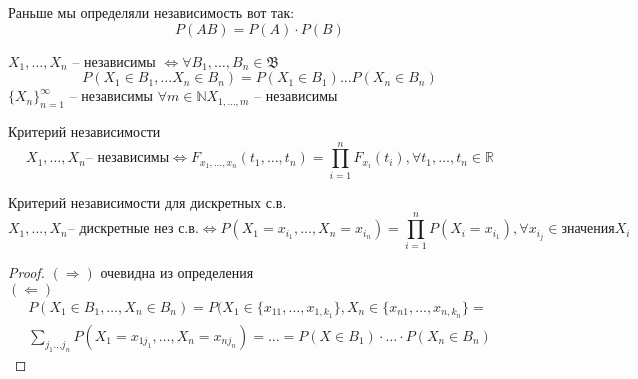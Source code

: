 \documentclass{article}
\newcommand{\B}{{\mathfrak B}}
\begin{document}
    Раньше мы определяли независимость вот так:
    $$ P(AB) = P(A) \cdot P(B) $$
    \begin{definition}
        $ X_1, \dots , X_n $ -- независимы $ \Leftrightarrow \forall B_1, \dots, B_n \in \B $
        $$P(X_1 \in B_1, \dots X_n \in B_n) = P(X_1 \in B_1) \dots P(X_n \in B_n)$$
         $\{X_n\}_{n=1}^{\infty} $ -- независимы $ \forall m \in \mathbb{N} X_{1, \dots, m} $ -- независимы
    \end{definition}

    \begin{theorem}{Критерий независимости}
    $$ X_1, \dots, X_n \text{-- независимы} \Leftrightarrow F_{x_1, \dots, x_n} (t_1, \dots, t_n) = \prod_{i=1}^n F_{x_i} (t_i), \forall t_1, \dots, t_n \in \mathbb{R}$$
    \end{theorem}
    \begin{theorem}{Критерий независимости для дискретных с.в.}
    $$ X_1, \dots, X_n \text{-- дискретные нез с.в.} \Leftrightarrow P(X_1=x_{i_1}, \dots, X_n = x_{i_n}) = \prod_{i=1}^n P(X_i=x_{i_1}), \forall x_{i_j} \in \text{значения} X_i$$
    \end{theorem}
    \begin{proof}
    $(\Rightarrow)$ очевидна из определения \\
    $(\Leftarrow)$ 
    \begin{align*}
    P(X_1 \in B_1, \dots, X_n \in B_n) = P(X_1 \in \{x_{11}, \dots, x_{1, k_1}\},  X_n \in \{x_{n1}, \dots, x_{n, k_n}\} = \\
    \sum\limits_{j_1 \dots j_n} P(X_1 = x_{1j_1}, \dots , X_n = x_{nj_n}) = \dots = P(X \in B_1) \cdot \dots \cdot P(X_n \in B_n)
    \end{align*}
    \end{proof}
    
\end{document}
